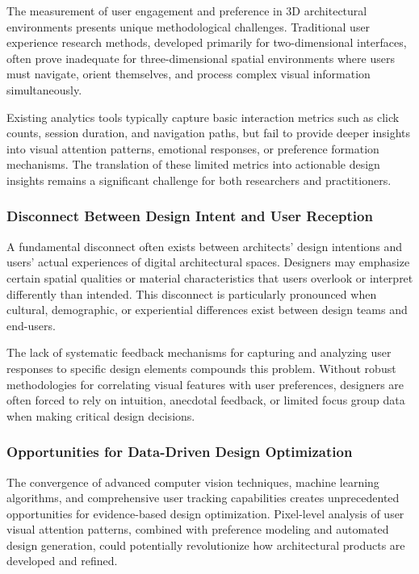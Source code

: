 The measurement of user engagement and preference in 3D architectural environments presents unique methodological challenges. Traditional user experience research methods, developed primarily for two-dimensional interfaces, often prove inadequate for three-dimensional spatial environments where users must navigate, orient themselves, and process complex visual information simultaneously.

Existing analytics tools typically capture basic interaction metrics such as click counts, session duration, and navigation paths, but fail to provide deeper insights into visual attention patterns, emotional responses, or preference formation mechanisms. The translation of these limited metrics into actionable design insights remains a significant challenge for both researchers and practitioners.

\subsubsection{Disconnect Between Design Intent and User Reception}
\label{subsubsec:design_intent_disconnect}

A fundamental disconnect often exists between architects' design intentions and users' actual experiences of digital architectural spaces. Designers may emphasize certain spatial qualities or material characteristics that users overlook or interpret differently than intended. This disconnect is particularly pronounced when cultural, demographic, or experiential differences exist between design teams and end-users.

The lack of systematic feedback mechanisms for capturing and analyzing user responses to specific design elements compounds this problem. Without robust methodologies for correlating visual features with user preferences, designers are often forced to rely on intuition, anecdotal feedback, or limited focus group data when making critical design decisions.

\subsubsection{Opportunities for Data-Driven Design Optimization}
\label{subsubsec:data_driven_opportunities}

The convergence of advanced computer vision techniques, machine learning algorithms, and comprehensive user tracking capabilities creates unprecedented opportunities for evidence-based design optimization. Pixel-level analysis of user visual attention patterns, combined with preference modeling and automated design generation, could potentially revolutionize how architectural products are developed and refined.

